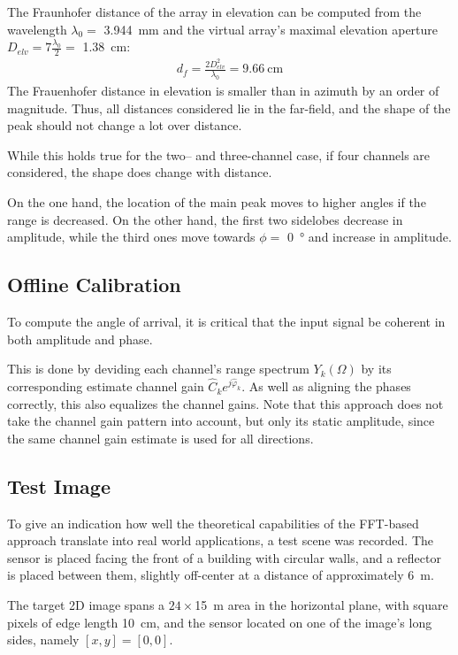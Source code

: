 The Fraunhofer distance of the array in elevation can be computed from the wavelength $\lambda_0=$ \SIlist{3.944}{\mm}
and the virtual array's maximal elevation aperture $D_{elv} = 7 \frac{\lambda_0}{2}=$ \SI{1.38}{\cm}:
\begin{align}
    d_f  = \frac{2D_{elv}^2}{\lambda_0}
    = \SI{9.66}{\cm}
\end{align}
The Frauenhofer distance in elevation is smaller than in azimuth by an order of magnitude.
Thus, all distances considered lie in the far-field,
and the shape of the peak should not change a lot over distance.

While this holds true for the two-- and three-channel case, if four channels are considered,
the shape does change with distance.

On the one hand, the location of the main peak moves to higher angles if the range is decreased.
On the other hand, the first two sidelobes decrease in amplitude,
while the third ones move towards $\phi=$ \SI{0}{\degree} and increase in amplitude.

\subsection{Offline Calibration}
To compute the angle of arrival, it is critical that the input signal be coherent in both amplitude and phase.

This is done by deviding each channel's range spectrum $Y_k(\Omega)$ by its corresponding estimate channel gain $\hat C_k e^{j\hat \varphi_k}$.
As well as aligning the phases correctly, this also equalizes the channel gains.
Note that this approach does not take the channel gain pattern into account, but only its static amplitude,
since the same channel gain estimate is used for all directions. \\

\newpage
\subsection{Test Image}
\label{sec:fft_result}
To give an indication how well the theoretical capabilities of the FFT-based approach translate into real world applications,
a test scene was recorded. The sensor is placed facing the front of a building with circular walls, and
a reflector is placed between them, slightly off-center at a distance of approximately \SI{6}{\m}.

The target 2D image spans a $24 \times$\SI{15}{\m} area in the horizontal plane,
with square pixels of edge length \SI{10}{\cm},
and the sensor located on one of the image's long sides, namely $[x,y] = [0,0]$.

